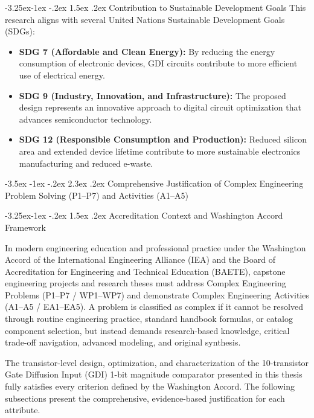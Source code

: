 \documentclass[12pt,a4paper,oneside]{report}
\makeatletter
\renewcommand\section{\@startsection {section}{1}{\z@}%
                                   {-3.5ex \@plus -1ex \@minus -.2ex}%
                                   {2.3ex \@plus.2ex}%
                                   {\normalfont\normalsize\bfseries}}
\renewcommand\subsection{\@startsection{subsection}{2}{\z@}%
                                     {-3.25ex\@plus -1ex \@minus -.2ex}%
                                     {1.5ex \@plus .2ex}%
                                     {\normalfont\normalsize\bfseries\itshape}}
\makeatother
\begin{document}
\subsection{Contribution to Sustainable Development Goals}
This research aligns with several United Nations Sustainable Development Goals (SDGs):
\begin{itemize}
\item \textbf{SDG 7 (Affordable and Clean Energy):} By reducing the energy consumption of electronic devices, GDI circuits contribute to more efficient use of electrical energy.
\item \textbf{SDG 9 (Industry, Innovation, and Infrastructure):} The proposed design represents an innovative approach to digital circuit optimization that advances semiconductor technology.
\item \textbf{SDG 12 (Responsible Consumption and Production):} Reduced silicon area and extended device lifetime contribute to more sustainable electronics manufacturing and reduced e-waste.
\end{itemize}
\section{Comprehensive Justification of Complex Engineering Problem Solving (P1--P7) and Activities (A1--A5)}

\subsection{Accreditation Context and Washington Accord Framework}

In modern engineering education and professional practice under the Washington Accord of the International Engineering Alliance (IEA) and the Board of Accreditation for Engineering and Technical Education (BAETE), capstone engineering projects and research theses must address Complex Engineering Problems (P1--P7 / WP1--WP7) and demonstrate Complex Engineering Activities (A1--A5 / EA1--EA5). A problem is classified as complex if it cannot be resolved through routine engineering practice, standard handbook formulas, or catalog component selection, but instead demands research-based knowledge, critical trade-off navigation, advanced modeling, and original synthesis.

The transistor-level design, optimization, and characterization of the 10-transistor Gate Diffusion Input (GDI) 1-bit magnitude comparator presented in this thesis fully satisfies every criterion defined by the Washington Accord. The following subsections present the comprehensive, evidence-based justification for each attribute.
\end{document}
